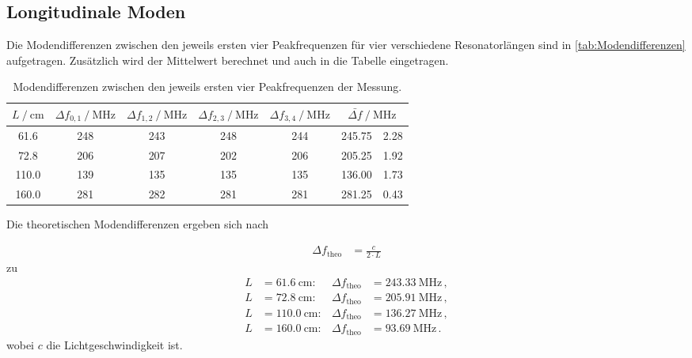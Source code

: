 \subsection{Longitudinale Moden}
\label{sub:Longitudinale Moden}

Die Modendifferenzen zwischen den jeweils ersten vier Peakfrequenzen für vier verschiedene Resonatorlängen sind in \autoref{tab:Modendifferenzen}
aufgetragen. Zusätzlich wird der Mittelwert berechnet und auch in die Tabelle eingetragen.

\begin{table}[H]
  \centering
  \caption{Modendifferenzen zwischen den jeweils ersten vier Peakfrequenzen der Messung.}
  \label{tab:Modendifferenzen}
  \begin{tabular}{S[table-format=2.1] S S S S S@{${}\pm{}$} S[table-format=3.2]}
    \toprule
    {$L \mathbin{/} \si{\centi\meter}$} &{$\Delta f_{0,1} \mathbin{/} \si{\mega\hertz}$} &
    {$\Delta f_{1,2} \mathbin{/} \si{\mega\hertz}$} &{$\Delta f_{2,3} \mathbin{/} \si{\mega\hertz}$} &
    {$\Delta f_{3,4} \mathbin{/} \si{\mega\hertz}$} & \\
      & 248 & 243 & 248 & 244 & 245.75 & 2.28\\
       72.8  & 206 & 207 & 202 & 206 & 205.25 & 1.92\\
      110.0  & 139 & 135 & 135 & 135 & 136.00 & 1.73\\
      160.0  & 281 & 282 & 281 & 281 & 281.25 & 0.43\\
    \bottomrule
  \end{tabular}
\end{table}

Die theoretischen Modendifferenzen ergeben sich nach

\begin{align*}
  \Delta f_{\text{theo}} &= \frac{c}{2 \cdot L}
\end{align*}
zu 
\begin{align*}
  L &= \SI{ 61.6}{\centi\meter}: & \Delta f_\text{theo} &= \SI{243.33}{\mega\hertz}\, , \\  
  L &= \SI{ 72.8}{\centi\meter}: & \Delta f_\text{theo} &= \SI{205.91}{\mega\hertz}\, , \\  
  L &= \SI{110.0}{\centi\meter}: & \Delta f_\text{theo} &= \SI{136.27}{\mega\hertz}\, , \\
  L &= \SI{160.0}{\centi\meter}: & \Delta f_\text{theo} &= \SI{93.69}{\mega\hertz}\, . 
\end{align*}
wobei $c$ die Lichtgeschwindigkeit ist.

